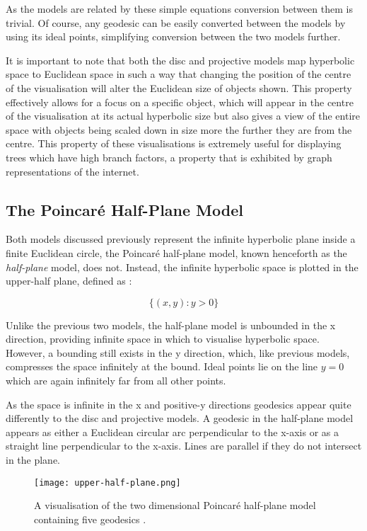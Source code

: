 As the models are related by these simple equations conversion between them is trivial. Of course, any geodesic can be easily converted between the models by using its ideal points, simplifying conversion between the two models further.

It is important to note that both the disc and projective models map hyperbolic space to Euclidean space in such a way that changing the position of the centre of the visualisation will alter the Euclidean size of objects shown. This property effectively allows for a focus on a specific object, which will appear in the centre of the visualisation at its actual hyperbolic size but also gives a view of the entire space with objects being scaled down in size more the further they are from the centre. This property of these visualisations is extremely useful for displaying trees which have high branch factors, a property that is exhibited by graph representations of the internet.

\subsection{The Poincar\'{e} Half-Plane Model}

Both models discussed previously represent the infinite hyperbolic plane inside a finite Euclidean circle, the Poincar\'{e} half-plane model, known henceforth as the \textit{half-plane} model, does not. Instead, the infinite hyperbolic space is plotted in the upper-half plane, defined as \cite{kubo_geometry_1988}:

\begin{equation}
\label{upper_half_plane}
\{(x,y):y>0\}
\end{equation}

Unlike the previous two models, the half-plane model is unbounded in the x direction, providing infinite space in which to visualise hyperbolic space. However, a bounding still exists in the y direction, which, like previous models, compresses the space infinitely at the bound. Ideal points lie on the line $y=0$ which are again infinitely far from all other points.

As the space is infinite in the x and positive-y directions geodesics appear quite differently to the disc and projective models. A geodesic in the half-plane model appears as either a Euclidean circular arc perpendicular to the x-axis or as a straight line perpendicular to the x-axis. Lines are parallel if they do not intersect in the plane.
\begin{figure}
	\centering
	\texttt{[image: upper-half-plane.png]}
	\caption[A visualisation of the two dimensional Poincar\'{e} half-plane model containing five geodesics]{A visualisation of the two dimensional Poincar\'{e} half-plane model containing five geodesics .}
	\label{fig:half-plane-example}
\end{figure}


